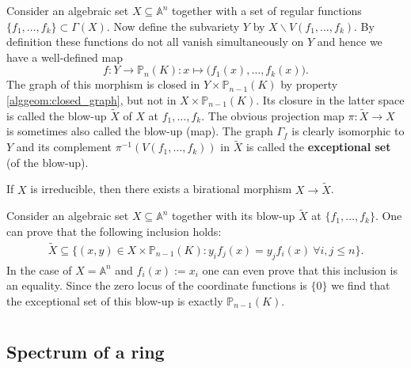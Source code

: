 {{    \begin{construct}[Blow-up]
        Consider an algebraic set $X\subseteq\mathbb{A}^n$ together with a set of regular functions $\{f_1,\ldots,f_k\}\subset\Gamma(X)$. Now define the subvariety $Y$ by $X\backslash V(f_1,\ldots,f_k)$. By definition these functions do not all vanish simultaneously on $Y$ and hence we have a well-defined map \[f:Y\rightarrow \mathbb{P}_n(K):x\mapsto\Big(f_1(x),\ldots,f_k(x)\Big).\] The graph of this morphism is closed in $Y\times\mathbb{P}_{n-1}(K)$ by property \ref{alggeom:closed_graph}, but not in $X\times\mathbb{P}_{n-1}(K)$. Its closure in the latter space is called the blow-up $\widetilde{X}$ of $X$ at $f_1,\ldots,f_k$. The obvious projection map $\pi:\widetilde{X}\rightarrow X$ is sometimes also called the blow-up (map). The graph $\Gamma_f$ is clearly isomorphic to $Y$ and its complement $\pi^{-1}(V(f_1,\ldots,f_k))$ in $\widetilde{X}$ is called the \textbf{exceptional set} (of the blow-up).

        If $X$ is irreducible, then there exists a birational morphism $X\rightarrow\widetilde{X}$.
    \end{construct}

    \begin{property}
        Consider an algebraic set $X\subseteq\mathbb{A}^n$ together with its blow-up $\widetilde{X}$ at $\{f_1,\ldots,f_k\}$. One can prove that the following inclusion holds:
        \begin{gather}
            \widetilde{X}\subseteq\{(x,y)\in X\times\mathbb{P}_{n-1}(K):y_if_j(x)=y_jf_i(x)\ \forall i,j\leq n\}.
        \end{gather}
        In the case of $X=\mathbb{A}^n$ and $f_i(x):=x_i$ one can even prove that this inclusion is an equality. Since the zero locus of the coordinate functions is $\{0\}$ we find that the exceptional set of this blow-up is exactly $\mathbb{P}_{n-1}(K)$.
    \end{property}

\section{}\label{section:schemes}
\subsection{Spectrum of a ring}


}}

